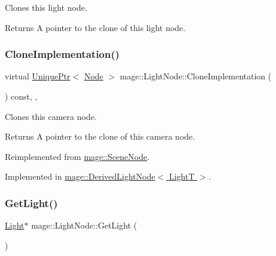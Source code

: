 Clones this light node.

\begin{DoxyReturn}{Returns}
A pointer to the clone of this light node. 
\end{DoxyReturn}
\hypertarget{classmage_1_1_light_node_aea97601d0a4b8073a1c655ca334af242}{}\label{classmage_1_1_light_node_aea97601d0a4b8073a1c655ca334af242} 
\subsubsection{\texorpdfstring{Clone\+Implementation()}{CloneImplementation()}}
{\footnotesize\ttfamily virtual \hyperlink{namespacemage_a8c307fbcc33bce9b7f2aa4c26c3b95cf}{Unique\+Ptr}$<$ \hyperlink{classmage_1_1_node}{Node} $>$ mage\+::\+Light\+Node\+::\+Clone\+Implementation (\begin{DoxyParamCaption}{ }\end{DoxyParamCaption}) const\hspace{0.3cm}{\ttfamily [override]}, {\ttfamily [private]}, {}}

Clones this camera node.

\begin{DoxyReturn}{Returns}
A pointer to the clone of this camera node. 
\end{DoxyReturn}


Reimplemented from \hyperlink{classmage_1_1_scene_node_a42d0d53ab804d38ebd584d2de6490eeb}{mage\+::\+Scene\+Node}.



Implemented in \hyperlink{classmage_1_1_derived_light_node_acf8858989780bf45a45c55a7c5564314}{mage\+::\+Derived\+Light\+Node$<$ Light\+T $>$}.

\hypertarget{classmage_1_1_light_node_a2b971e64ec2267d49c2ba96a00662d3b}{}\label{classmage_1_1_light_node_a2b971e64ec2267d49c2ba96a00662d3b} 
\subsubsection{\texorpdfstring{Get\+Light()}{GetLight()}\hspace{0.1cm}{\footnotesize\ttfamily [1/2]}}
{\footnotesize\ttfamily \hyperlink{classmage_1_1_light}{Light}$\ast$ mage\+::\+Light\+Node\+::\+Get\+Light (\begin{DoxyParamCaption}{ }\end{DoxyParamCaption})\hspace{0.3cm}{\ttfamily [noexcept]}}

